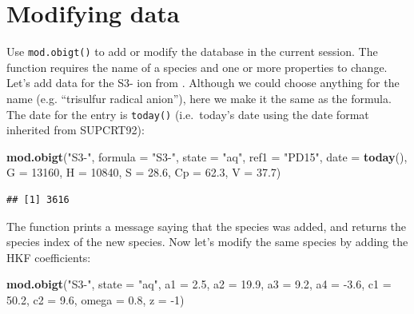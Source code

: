 \documentclass[]{tufte-book}
\newenvironment{Shaded}{}{}
\newcommand{\KeywordTok}[1]{\textcolor[rgb]{0.00,0.44,0.13}{\textbf{#1}}}
\newcommand{\DataTypeTok}[1]{\textcolor[rgb]{0.56,0.13,0.00}{#1}}
\newcommand{\DecValTok}[1]{\textcolor[rgb]{0.25,0.63,0.44}{#1}}
\newcommand{\FloatTok}[1]{\textcolor[rgb]{0.25,0.63,0.44}{#1}}
\newcommand{\StringTok}[1]{\textcolor[rgb]{0.25,0.44,0.63}{#1}}
\newcommand{\OperatorTok}[1]{\textcolor[rgb]{0.40,0.40,0.40}{#1}}
\newcommand{\NormalTok}[1]{#1}
\begin{document}
\section{Modifying data}\label{modifying-data}

Use {\texttt{mod.obigt()}} to add or modify the database in the current
session. The function requires the name of a species and one or more
properties to change. Let's add data for the S3- ion from \citet{PD15}.
Although we could choose anything for the name (e.g. ``trisulfur radical
anion''), here we make it the same as the formula. The date for the
entry is {\texttt{today()}} (i.e.~today's date using the date format
inherited from SUPCRT92):

\begin{Shaded}
\begin{Highlighting}[]
\KeywordTok{mod.obigt}\NormalTok{(}\StringTok{"S3-"}\NormalTok{, }\DataTypeTok{formula =} \StringTok{"S3-"}\NormalTok{, }\DataTypeTok{state =} \StringTok{"aq"}\NormalTok{, }\DataTypeTok{ref1 =} \StringTok{"PD15"}\NormalTok{, }\DataTypeTok{date =} \KeywordTok{today}\NormalTok{(),}
          \DataTypeTok{G =} \DecValTok{13160}\NormalTok{, }\DataTypeTok{H =} \DecValTok{10840}\NormalTok{, }\DataTypeTok{S =} \FloatTok{28.6}\NormalTok{, }\DataTypeTok{Cp =} \FloatTok{62.3}\NormalTok{, }\DataTypeTok{V =} \FloatTok{37.7}\NormalTok{)}
\end{Highlighting}
\end{Shaded}

\begin{verbatim}
## [1] 3616
\end{verbatim}

The function prints a message saying that the species was added, and
returns the species index of the new species. Now let's modify the same
species by adding the HKF coefficients:

\begin{Shaded}
\begin{Highlighting}[]
\KeywordTok{mod.obigt}\NormalTok{(}\StringTok{"S3-"}\NormalTok{, }\DataTypeTok{state =} \StringTok{"aq"}\NormalTok{, }\DataTypeTok{a1 =} \FloatTok{2.5}\NormalTok{, }\DataTypeTok{a2 =} \FloatTok{19.9}\NormalTok{, }\DataTypeTok{a3 =} \FloatTok{9.2}\NormalTok{, }\DataTypeTok{a4 =} \OperatorTok{-}\FloatTok{3.6}\NormalTok{,}
          \DataTypeTok{c1 =} \FloatTok{50.2}\NormalTok{, }\DataTypeTok{c2 =} \FloatTok{9.6}\NormalTok{, }\DataTypeTok{omega =} \FloatTok{0.8}\NormalTok{, }\DataTypeTok{z =} \OperatorTok{-}\DecValTok{1}\NormalTok{)}
\end{Highlighting}
\end{Shaded}
\end{document}
